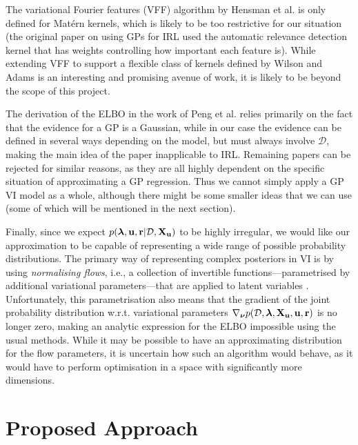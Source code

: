 \documentclass{mprop}
\theoremstyle{definition}
\begin{document}
The variational Fourier features (VFF) algorithm by Hensman et al.
\cite{DBLP:journals/jmlr/HensmanDS17} is only defined for Mat\'ern kernels,
which is likely to be too restrictive for our situation (the original paper on
using GPs for IRL \cite{DBLP:conf/nips/LevinePK11} used the automatic relevance
detection kernel that has weights controlling how important each feature is).
While extending VFF to support a flexible class of kernels defined by Wilson and
Adams \cite{pmlr-v28-wilson13} is an interesting and promising avenue of work,
it is likely to be beyond the scope of this project.

The derivation of the ELBO in the work of Peng et al.
\cite{DBLP:conf/icml/PengZZQ17} relies primarily on the fact that the evidence
for a GP is a Gaussian, while in our case the evidence can be defined in several
ways depending on the model, but must always involve $\mathcal{D}$, making the
main idea of the paper inapplicable to IRL. Remaining papers can be rejected for
similar reasons, as they are all highly dependent on the specific situation of
approximating a GP regression. Thus we cannot simply apply a GP VI model as a
whole, although there might be some smaller ideas that we can use (some of which
will be mentioned in the next section).

Finally, since we expect $p(\bm\lambda, \mathbf{u}, \mathbf{r} | \mathcal{D}, \mathbf{X_u})$ to be highly irregular, we would like our
approximation to be capable of representing a wide range of possible probability
distributions. The primary way of representing complex posteriors in VI is by
using \emph{normalising flows}, i.e., a collection of invertible
functions---parametrised by additional variational parameters---that are applied
to latent variables \cite{DBLP:conf/icml/RezendeM15}. Unfortunately, this
parametrisation also means that the gradient of the joint probability
distribution w.r.t. variational parameters $\nabla_{\bm\nu}p(\mathcal{D}, \bm\lambda, \mathbf{X_u}, \mathbf{u}, \mathbf{r})$ is no longer
zero, making an analytic expression for the ELBO impossible using the usual
methods. While it may be possible to have an approximating distribution for the
flow parameters, it is uncertain how such an algorithm would behave, as it would
have to perform optimisation in a space with significantly more dimensions.

\section{Proposed Approach} \label{sec:proposed_approach}
\end{document}

